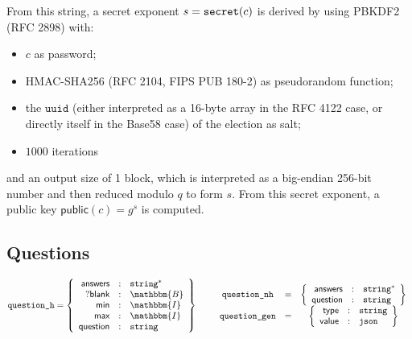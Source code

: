 \documentclass[a4paper]{article}
\newcommand{\I}{\mathbbm{I}}
\newcommand{\B}{\mathbbm{B}}
\newcommand{\public}{\textsf{public}}
\newcommand{\jstring}{\texttt{string}}
\newcommand{\uuid}{\texttt{uuid}}
\begin{document}
From this string, a secret exponent $s=\texttt{secret}(c)$ is derived by using
PBKDF2 (RFC 2898) with:
\begin{itemize}
\item $c$ as password;
\item HMAC-SHA256 (RFC 2104, FIPS PUB 180-2) as pseudorandom function;
\item the $\uuid$ (either interpreted as a 16-byte array in the RFC
  4122 case, or directly itself in the Base58 case) of the election as
  salt;
\item $1000$ iterations
\end{itemize}
and an output size of 1 block, which is interpreted as a big-endian
256-bit number and then reduced modulo $q$ to form $s$.  From this
secret exponent, a public key $\public(c)=g^s$ is computed.

\subsection{Questions}
\label{questions}

\newcommand{\question}{\texttt{question}}

\newcommand{\blank}{\textsf{blank}}
\newcommand{\minlabel}{\textsf{min}}
\newcommand{\maxlabel}{\textsf{max}}
\newcommand{\answers}{\textsf{answers}}

\begin{gather*}
  \texttt{question\_h}=\left\{
    \begin{array}{rcl}
      \answers&:&\jstring^\ast\\
      ?\blank&:&\B\\
      \minlabel&:&\I\\
      \maxlabel&:&\I\\
      \textsf{question}&:&\jstring
    \end{array}
  \right\}
  \qquad
  \begin{array}{ccc}
    \texttt{question\_nh}&=&\left\{
      \begin{array}{rcl}
        \answers&:&\jstring^\ast\\
        \textsf{question}&:&\jstring
      \end{array}
    \right\}\\
    \texttt{question\_gen}&=&\left\{
      \begin{array}{rcl}
        \textsf{type}&:&\jstring\\
        \textsf{value}&:&\texttt{json}
      \end{array}
    \right\}
  \end{array}
\end{gather*}
\end{document}
